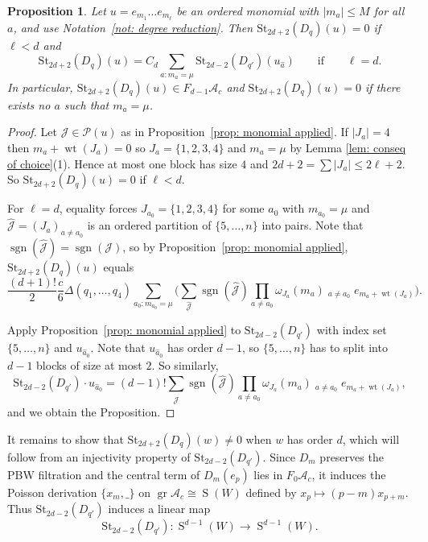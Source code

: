 \documentclass[12pt]{amsart}
\theoremstyle{plain}
\newtheorem{proposition}[theorem]{Proposition}
\theoremstyle{definition}
\numberwithin{equation}{theorem}
\newcommand{\Sa}{\operatorname{S}}
\newcommand{\sgn}{\operatorname{sgn}}
\newcommand{\gr}{\operatorname{gr}}
\newcommand{\mc}[1]{\mathcal{#1}}
\newcommand{\calA}{\mathcal A}
\newcommand{\St}{\mathrm{St}}
\newcommand{\length}[1]{\left\lvert #1\right\rvert}
\newcommand{\wt}{\operatorname{wt}}
\DeclareMathOperator*{\iprod}{\overset{\rightarrow}{\prod}}
\begin{document}
\begin{proposition}\label{prop: leading term}
    Let $u = e_{m_1} \dots e_{m_\ell}$ be an ordered monomial with $\length{m_a} \leq M$ for all $a$, and use Notation~\ref{not: degree reduction}. Then $\St_{2d+2}(D_q)(u) = 0$ if $\ell <d$ and 
    \begin{equation}
            \St_{2d+2}(D_q)(u) = C_d \sum_{a: m_a = \mu} \St_{2d-2}(D_{q'})(u_{\hat{a}}) \qquad \text{if}\qquad \ell = d.
        \end{equation}    
    In particular, $\St_{2d+2}(D_q)(u) \in F_{d-1} \calA_c$ and $\St_{2d+2}(D_q)(u) = 0$ if there exists no $a$ such that $m_a = \mu$.  
\end{proposition}
\begin{proof}
    Let $\mc{J} \in \mc{P}(u)$ as in Proposition~\ref{prop: monomial applied}. If $\length{J_a} = 4$ then $m_a + \wt(J_a) =0$ so $J_a = \{1, 2, 3, 4\}$ and $m_a = \mu$ by Lemma \ref{lem: conseq of choice}(1). Hence at most one block has size $4$ and $2d+2 = \sum \length{J_a} \leq 2\ell+2$. So $\St_{2d+2}(D_q)(u) = 0$ if $\ell < d$.

    For $\ell = d$, equality forces $J_{a_0} = \{1, 2, 3, 4\}$ for some $a_0$ with $m_{a_0} = \mu$ and $\widehat{\mc{J}} = (J_a)_{a \neq a_0}$ is an ordered partition of $\{5, \dots, n\}$ into pairs. Note that $\sgn(\widehat{\mc{J}}) = \sgn(\mc{J})$, so by Proposition~\ref{prop: monomial applied}, $\St_{2d+2}(D_q)(u)$ equals
    \begin{equation*}
         \frac{(d+1)!}{2}\frac{c}{6} \Delta(q_1, \dots, q_4) \sum_{a_0: m_{a_0} = \mu} \Big(\sum_{\widehat{\mc{J}}} \sgn(\widehat{\mc{J}}) \prod_{a \neq a_0} \omega_{J_a}(m_a) \iprod_{a \neq a_0} e_{m_a + \wt(J_a)}  \Big).
    \end{equation*}
    
    Apply Proposition~\ref{prop: monomial applied} to $\St_{2d-2}(D_{q'})$ with index set $\{5, \dots, n\}$ and $u_{\hat{a}_0}$. Note that $u_{\hat{a}_0}$ has order $d-1$, so $\{5, \dots, n\}$ has to split into $d-1$ blocks of size at most $2$. So similarly, 
    \begin{equation*}
        \St_{2d-2}(D_{q'}) \cdot 
        u_{\hat{a}_0} = (d-1)!\sum_{\widehat{\mc{J}}}\sgn(\widehat{\mc{J}}) \prod_{a \neq a_0} \omega_{J_a}(m_a) \iprod_{a \neq a_0} e_{m_a + \wt(J_a)},
    \end{equation*}
    and we obtain the Proposition.
\end{proof}
It remains to show that $\St_{2d+2}(D_q)(w) \neq 0$ when $w$ has order $d$, which will follow from an injectivity property of $\St_{2d-2}(D_{q'})$. Since $D_m$ preserves the PBW filtration and the central term of $D_m(e_p)$ lies in $F_0 \calA_c$, it induces the Poisson derivation $\{x_m, \_\}$ on $\gr \calA_c \cong \Sa(W)$ defined by $x_p \mapsto (p-m)x_{p+m}$. Thus $\St_{2d-2}(D_{q'})$ induces a linear map 
\[\St_{2d-2}(D_{q'}): \Sa^{d-1}(W) \to \Sa^{d-1}(W).\]
\end{document}
